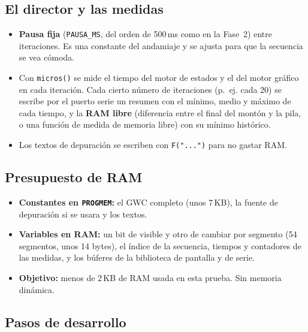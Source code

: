 \subsection{El director y las medidas}
\label{sec:F6I02Director}

\begin{itemize}
	\item \textbf{Pausa fija} (\texttt{PAUSA\_MS}, del orden de 500\,ms como en la Fase~2) entre iteraciones. Es una constante del andamiaje y se ajusta para que la secuencia se vea cómoda.
	\item Con \texttt{micros()} se mide el tiempo del motor de estados y el del motor gráfico en cada iteración. Cada cierto número de iteraciones (p.~ej. cada 20) se escribe por el puerto serie un resumen con el mínimo, medio y máximo de cada tiempo, y la \textbf{RAM libre} (diferencia entre el final del montón y la pila, o una función de medida de memoria libre) con su mínimo histórico.
	\item Los textos de depuración se escriben con \texttt{F("...")} para no gastar RAM.
\end{itemize}

\subsection{Presupuesto de RAM}
\label{sec:F6I02Ram}

\begin{itemize}
	\item \textbf{Constantes en \texttt{PROGMEM}:} el GWC completo (unos 7\,KB), la fuente de depuración si se usara y los textos.
	\item \textbf{Variables en RAM:} un bit de visible y otro de cambiar por segmento (54 segmentos, unos 14 bytes), el índice de la secuencia, tiempos y contadores de las medidas, y los búferes de la biblioteca de pantalla y de serie.
	\item \textbf{Objetivo:} menos de 2\,KB de RAM usada en esta prueba. Sin memoria dinámica.
\end{itemize}

\subsection{Pasos de desarrollo}
\label{sec:F6I02Pasos}

